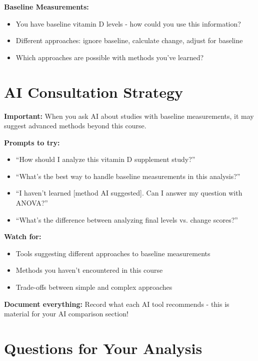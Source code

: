 \documentclass[11pt]{article}
\begin{document}
\textbf{Baseline Measurements:}
\begin{itemize}
\item You have baseline vitamin D levels - how could you use this information?
\item Different approaches: ignore baseline, calculate change, adjust for baseline
\item Which approaches are possible with methods you've learned?
\end{itemize}

\section*{AI Consultation Strategy}

\begin{tcolorbox}[colback=aiblue!10,colframe=aiblue,boxrule=1pt,arc=2pt]
\textbf{Important:} When you ask AI about studies with baseline measurements, it may suggest advanced methods beyond this course.

\textbf{Prompts to try:}
\begin{itemize}
\item ``How should I analyze this vitamin D supplement study?''
\item ``What's the best way to handle baseline measurements in this analysis?''
\item ``I haven't learned [method AI suggested]. Can I answer my question with ANOVA?''
\item ``What's the difference between analyzing final levels vs. change scores?''
\end{itemize}

\textbf{Watch for:}
\begin{itemize}
\item Tools suggesting different approaches to baseline measurements
\item Methods you haven't encountered in this course
\item Trade-offs between simple and complex approaches
\end{itemize}

\textbf{Document everything:} Record what each AI tool recommends - this is material for your AI comparison section!
\end{tcolorbox}

\section*{Questions for Your Analysis}
\end{document}
